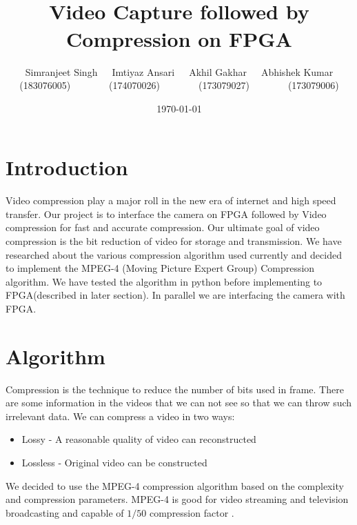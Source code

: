 \documentclass[a4paper]{article}
\title{
    \thispagestyle{firststyle}
\courseName \\
\textbf{Video Capture followed by Compression on FPGA}\\
\textbf{\hwTitle}}
\author{Simranjeet Singh\ \ \ Imtiyaz Ansari\ \ \ Akhil Gakhar\ \ \ Abhishek Kumar\\
(183076005)\ \ \ \ \ \ \ \  (174070026)\ \ \ \ \ \ \ \ (173079027)\ \ \ \ \ \ \ \  (173079006)}
\date{\today}
\begin{document}
\maketitle

\section{Introduction}
Video compression play a major roll in the new era of internet and high speed transfer. Our project is to interface the camera on FPGA followed by Video compression for fast and accurate compression. Our ultimate goal of video compression is the bit reduction of video for storage and transmission. We have researched about the various compression algorithm used currently and decided to implement the MPEG-4 (Moving Picture Expert Group)
Compression algorithm. We have tested the algorithm in python before implementing to FPGA(described in later section). In parallel we are interfacing the camera with FPGA.

\section{Algorithm}
Compression is the technique to reduce the number of bits used in frame. There are some information in the videos that we can not see so that we can throw such irrelevant data.
We can compress a video in two ways:
\begin{itemize}
    \item Lossy - A reasonable quality of video can reconstructed
    \item Lossless - Original video can be constructed 
\end{itemize}

We decided to use the MPEG-4 compression algorithm based on the complexity and compression parameters. MPEG-4 is good for video streaming and television broadcasting and capable of $1/50$ compression factor \cite{comp}. 
\end{document}
